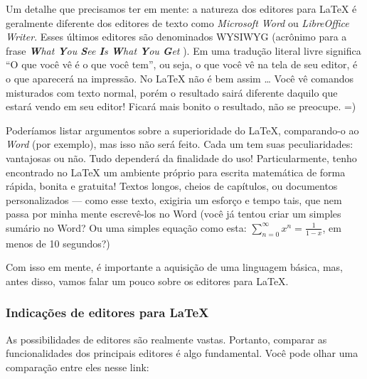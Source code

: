 Um detalhe que precisamos ter em mente: a natureza dos editores para \LaTeX{}
é geralmente diferente dos editores de texto como \textit{Microsoft Word} ou 
\textit{LibreOffice Writer}.
Esses últimos editores são denominados WYSIWYG (acrônimo para a frase 
\textit{
  \textbf{W}hat \textbf{Y}ou \textbf{S}ee \textbf{I}s \textbf{W}hat \textbf{Y}ou \textbf{G}et
}).
Em uma tradução literal livre significa ``O que você vê é o que você tem'', ou 
seja, o que você vê na tela de seu editor, é o que aparecerá na impressão. 
No \LaTeX{} não é bem assim \ldots 
Você vê comandos misturados com texto normal, porém o resultado sairá diferente 
daquilo que estará vendo em seu editor! 
Ficará mais bonito o resultado, não se preocupe. =)

Poderíamos listar argumentos sobre a superioridade do \LaTeX{}, comparando-o ao 
\textit{Word} (por exemplo), mas isso não será feito. 
Cada um tem suas peculiaridades: vantajosas ou não. 
Tudo dependerá da finalidade do uso!
Particularmente, tenho encontrado no \LaTeX{} um ambiente próprio para escrita 
matemática de forma rápida, bonita e gratuita! 
Textos longos, cheios de capítulos, ou documentos personalizados --- como esse 
texto, exigiria um esforço e tempo tais, que nem passa por minha mente 
escrevê-los no Word (você já tentou criar um simples sumário no Word? 
Ou uma simples equação como esta: $\sum\limits_{n = 0}^{\infty} x^n = \frac{1}{1 - x}$, 
em menos de 10 segundos?)

Com isso em mente, é importante a aquisição de uma linguagem básica, mas, antes 
disso, vamos falar um pouco sobre os editores para \LaTeX.

\subsubsection{Indicações de editores para \LaTeX} %

As possibilidades de editores são realmente vastas.
Portanto, comparar as funcionalidades dos principais editores é algo fundamental.
Você pode olhar uma comparação entre eles nesse link:

